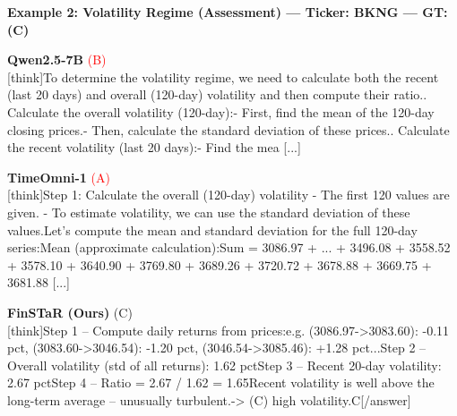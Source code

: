 \noindent
\textbf{Example 2: Volatility Regime (Assessment) --- Ticker: BKNG --- GT: (C)}
\vspace{2pt}

\noindent
\begin{minipage}[t]{0.28\textwidth}
\colorbox{red!8}{\parbox{\dimexpr\textwidth-2\fboxsep}{
\textbf{Qwen2.5-7B} \textcolor{red}{(B)} \\[2pt]
\tiny
[think]\newline To determine the volatility regime, we need to calculate both the recent (last 20 days) and overall (120-day) volatility and then compute their ratio.. Calculate the overall volatility (120-day):\newline    - First, find the mean of the 120-day closing prices.\newline    - Then, calculate the standard deviation of these prices.. Calculate the recent volatility (last 20 days):\newline    - Find the mea [...]
}}
\end{minipage}
\hfill
\begin{minipage}[t]{0.28\textwidth}
\colorbox{red!8}{\parbox{\dimexpr\textwidth-2\fboxsep}{
\textbf{TimeOmni-1} \textcolor{red}{(A)} \\[2pt]
\tiny
[think]\newline Step 1: Calculate the overall (120-day) volatility  \newline - The first 120 values are given.  \newline - To estimate volatility, we can use the standard deviation of these values.\newline Let's compute the mean and standard deviation for the full 120-day series:\newline Mean (approximate calculation):\newline Sum = 3086.97 + ... + 3496.08 + 3558.52 + 3578.10 + 3640.90 + 3769.80 + 3689.26 + 3720.72 + 3678.88 + 3669.75 + 3681.88 [...]
}}
\end{minipage}
\hfill
\begin{minipage}[t]{0.41\textwidth}
\colorbox{green!10}{\parbox{\dimexpr\textwidth-2\fboxsep}{
\textbf{FinSTaR (Ours)} \textcolor{green!50!black}{(C)} \\[2pt]
\tiny
[think]\newline Step 1 -- Compute daily returns from prices:\newline   e.g. (3086.97->3083.60): -0.11 pct, (3083.60->3046.54): -1.20 pct, (3046.54->3085.46): +1.28 pct\newline   ...\newline Step 2 -- Overall volatility (std of all returns): 1.62 pct\newline Step 3 -- Recent 20-day volatility: 2.67 pct\newline Step 4 -- Ratio = 2.67 / 1.62 = 1.65\newline Recent volatility is well above the long-term average -- unusually turbulent.\newline -> (C) high volatility.\newline [/think]\newline [answer]C[/answer]
}}
\end{minipage}

